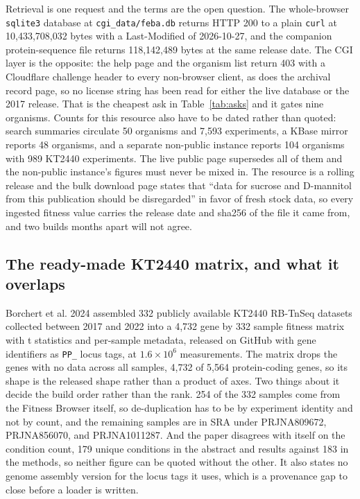 Retrieval is one request and the terms are the open question. The whole-browser
\texttt{sqlite3} database at \texttt{cgi\_data/feba.db} returns HTTP 200 to a plain
\texttt{curl} at 10,433,708,032 bytes with a Last-Modified of 2026-10-27, and the companion
protein-sequence file returns 118,142,489 bytes at the same release date. The CGI layer is the
opposite: the help page and the organism list return 403 with a Cloudflare challenge header to
every non-browser client, as does the archival record page, so no license string has been read
for either the live database or the 2017 release. That is the cheapest ask in
Table~\ref{tab:asks} and it gates nine organisms. Counts for this resource also have to be
dated rather than quoted: search summaries circulate 50 organisms and 7,593 experiments, a
KBase mirror reports 48 organisms, and a separate non-public instance reports 104 organisms
with 989 KT2440 experiments. The live public page supersedes all of them and the non-public
instance's figures must never be mixed in. The resource is a rolling release and the bulk
download page states that ``data for sucrose and D-mannitol from this publication should be
disregarded'' in favor of fresh stock data, so every ingested fitness value carries the release date and
sha256 of the file it came from, and two builds months apart will not agree.

\subsection{The ready-made KT2440 matrix, and what it overlaps}\label{sec:pseudo-kt}

Borchert et al. 2024 assembled 332 publicly available KT2440 RB-TnSeq datasets collected
between 2017 and 2022 into a 4,732 gene by 332 sample fitness matrix with t statistics and
per-sample metadata, released on GitHub with gene identifiers as \texttt{PP\_} locus tags, at
$1.6\times10^{6}$ measurements. The matrix drops the genes with no data across all samples,
4,732 of 5,564 protein-coding genes, so its shape is the released shape rather than a product
of axes. Two things about it decide the build order rather than the rank. 254 of the 332
samples come from the Fitness Browser itself, so de-duplication has to be by experiment
identity and not by count, and the remaining samples are in SRA under PRJNA809672,
PRJNA856070, and PRJNA1011287. And the paper disagrees with itself on the condition count, 179
unique conditions in the abstract and results against 183 in the methods, so neither figure can
be quoted without the other. It also states no genome assembly version for the locus tags it
uses, which is a provenance gap to close before a loader is written.

